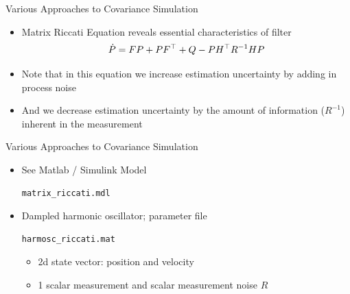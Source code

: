 \begin{frame}[fragile]
Various Approaches to Covariance Simulation
\begin{itemize}
  \item Matrix Riccati Equation reveals essential characteristics of filter
\[\dot{P}=FP+PF^\top+Q - PH^\top R^{-1}HP\]
  \item Note that in this equation we increase estimation uncertainty by adding in process noise
  \item And we decrease estimation uncertainty by the amount of information ($R^{-1}$) inherent in the measurement 
\end{itemize} 
\end{frame}
\begin{frame}[fragile]
Various Approaches to Covariance Simulation
\begin{itemize}
  \item See Matlab / Simulink Model \begin{verbatim}matrix_riccati.mdl\end{verbatim}
  \item Dampled harmonic oscillator; parameter file \begin{verbatim}harmosc_riccati.mat\end{verbatim}
	\begin{itemize}
		\item 2d state vector: position and velocity
		\item 1 scalar measurement and scalar measurement noise $R$
	\end{itemize}
\end{itemize} 
\end{frame}

\begin{frame}

\begin{center}
\end{center}
\end{frame}


\begin{frame}
\begin{center}
\end{center}
\end{frame}

\begin{frame}
\begin{center}
\end{center}
\end{frame}


